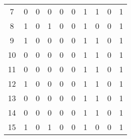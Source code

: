 \begin{longtable}{cp{1.5cm}p{1.5cm}p{1.5cm}p{1.5cm}p{1.5cm}p{1.5cm}p{1.5cm}p{1.5cm}p{1.5cm}}
7  &                          0 &                             0 &                          0 &                        0 &                           0 &                        1 &                         1 &                            0 &                         1 \\
8  &                          1 &                             0 &                          1 &                        0 &                           0 &                        1 &                         0 &                            0 &                         1 \\
9  &                          1 &                             0 &                          0 &                        0 &                           0 &                        1 &                         1 &                            0 &                         1 \\
10 &                          0 &                             0 &                          0 &                        0 &                           0 &                        1 &                         1 &                            0 &                         1 \\
11 &                          0 &                             0 &                          0 &                        0 &                           0 &                        1 &                         1 &                            0 &                         1 \\
12 &                          1 &                             0 &                          0 &                        0 &                           0 &                        1 &                         1 &                            0 &                         1 \\
13 &                          0 &                             0 &                          0 &                        0 &                           0 &                        1 &                         1 &                            0 &                         1 \\
14 &                          0 &                             0 &                          0 &                        0 &                           0 &                        1 &                         1 &                            0 &                         1 \\
15 &                          1 &                             0 &                          1 &                        0 &                           0 &                        1 &                         0 &                            0 &                         1 \\

\end{longtable}
